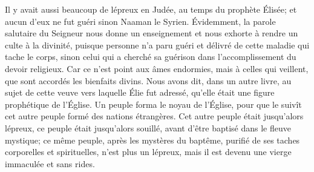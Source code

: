 Il y avait aussi beaucoup de lépreux en Judée, au temps du prophète Élisée;
	et aucun d’eux ne fut guéri sinon Naaman le Syrien.
Évidemment, la parole salutaire du Seigneur nous donne un enseignement
	et nous exhorte à rendre un culte à la divinité,
	puisque personne n’a paru guéri et délivré
		de cette maladie qui tache le corps,
	sinon celui qui a cherché sa guérison
		dans l’accomplissement du devoir religieux.
Car ce n’est point aux âmes endormies, mais à celles qui veillent,
	que sont accordés les bienfaits divins.
Nous avons dit, dans un autre livre,
	au sujet de cette veuve vers laquelle Élie fut adressé,
	qu’elle était une figure prophétique de l’Église.
Un peuple forma le noyau de l’Église,
	pour que le suivît cet autre peuple formé des nations étrangères.
Cet autre peuple était jusqu’alors lépreux,
	ce peuple était jusqu’alors souillé,
	avant d’être baptisé dans le fleuve mystique;
	ce même peuple, après les mystères du baptême,
	purifié de ses taches corporelles et spirituelles, n’est plus un lépreux,
	mais il est devenu une vierge immaculée et sans rides.
